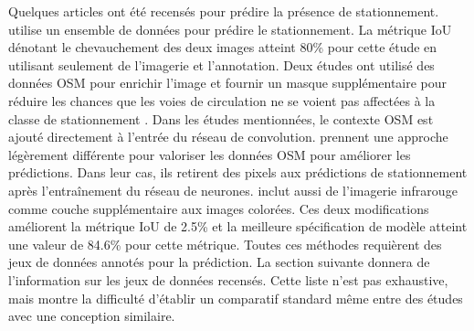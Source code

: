         Quelques articles ont été recensés pour prédire la présence de stationnement. \textcite{hurst-tarrab_robust_2020} utilise un ensemble de données pour prédire le stationnement. La métrique \ac{IoU} dénotant le chevauchement des deux images atteint 80\% pour cette étude en utilisant seulement de l'imagerie et l'annotation. Deux études ont utilisé des données \ac{OSM} pour enrichir l'image et fournir un masque supplémentaire pour réduire les chances que les voies de circulation ne se voient pas  affectées à la classe de stationnement \parencite{hellekes_parking_2023,yin_context-enriched_2022}. Dans les études mentionnées, le contexte \ac{OSM} est ajouté directement à l'entrée du réseau de convolution. \textcite{qiam_pipeline_2025} prennent une approche légèrement différente pour valoriser les données \ac{OSM} pour améliorer les prédictions. Dans leur cas, ils retirent des pixels aux prédictions de stationnement après l’entraînement du réseau de neurones. \textcite{qiam_pipeline_2025} inclut aussi de l'imagerie infrarouge comme couche supplémentaire aux images colorées. Ces deux modifications améliorent la métrique \ac{IoU} de 2.5\% et la meilleure spécification de modèle atteint une valeur de 84.6\% pour cette métrique. 
        Toutes ces méthodes requièrent des jeux de données annotés pour la prédiction. La section suivante donnera de l'information sur les jeux de données recensés. Cette liste n'est pas exhaustive, mais montre la difficulté d'établir un comparatif standard même entre des études avec une conception similaire.
